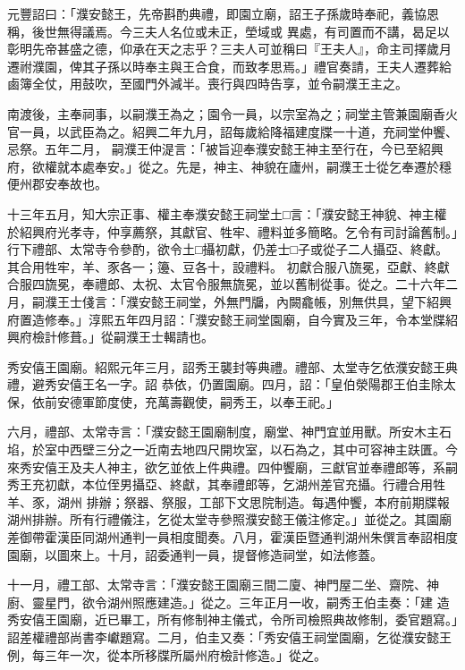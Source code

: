 \begin{pinyinscope}
 元豐詔曰：「濮安懿王，先帝斟酌典禮，即園立廟，詔王子孫歲時奉祀，義協恩稱，後世無得議焉。今三夫人名位或未正，塋域或
 異處，有司置而不講，曷足以彰明先帝甚盛之德，仰承在天之志乎？三夫人可並稱曰『王夫人』，命主司擇歲月遷祔濮園，俾其子孫以時奉主與王合食，而致孝思焉。」禮官奏請，王夫人遷葬給鹵簿全仗，用鼓吹，至國門外減半。喪行與四時告享，並令嗣濮王主之。



 南渡後，主奉祠事，以嗣濮王為之；園令一員，以宗室為之；祠堂主管兼園廟香火官一員，以武臣為之。紹興二年九月，詔每歲給降福建度牒一十道，充祠堂仲饗、忌祭。五年二月，
 嗣濮王仲湜言：「被旨迎奉濮安懿王神主至行在，今已至紹興府，欲權就本處奉安。」從之。先是，神主、神貌在廬州，嗣濮王士從乞奉遷於穩便州郡安奉故也。



 十三年五月，知大宗正事、權主奉濮安懿王祠堂土□言：「濮安懿王神貌、神主權於紹興府光孝寺，仲享薦祭，其獻官、牲牢、禮料並多簡略。乞令有司討論舊制。」行下禮部、太常寺令參酌，欲令土□攝初獻，仍差士□子或從子二人攝亞、終獻。其合用牲牢，羊、豕各一；籩、豆各十，設禮料。
 初獻合服八旒冕，亞獻、終獻合服四旒冕，奉禮郎、太祝、太官令服無旒冕，並以舊制從事。從之。二十六年二月，嗣濮王士俴言：「濮安懿王祠堂，外無門牖，內闕龕帳，別無供具，望下紹興府置造修奉。」淳熙五年四月詔：「濮安懿王祠堂園廟，自今實及三年，令本堂牒紹興府檢計修葺。」從嗣濮王士輵請也。



 秀安僖王園廟。紹熙元年三月，詔秀王襲封等典禮。禮部、太堂寺乞依濮安懿王典禮，避秀安僖王名一字。詔
 恭依，仍置園廟。四月，詔：「皇伯滎陽郡王伯圭除太保，依前安德軍節度使，充萬壽觀使，嗣秀王，以奉王祀。」



 六月，禮部、太常寺言：「濮安懿王園廟制度，廟堂、神門宜並用獸。所安木主石埳，於室中西壁三分之一近南去地四尺開坎室，以石為之，其中可容神主趺匱。今來秀安僖王及夫人神主，欲乞並依上件典禮。四仲饗廟，三獻官並奉禮郎等，系嗣秀王充初獻，本位侄男攝亞、終獻，其奉禮郎等，乞湖州差官充攝。行禮合用牲羊、豕，湖州
 排辦；祭器、祭服，工部下文思院制造。每遇仲饗，本府前期牒報湖州排辦。所有行禮儀注，乞從太堂寺參照濮安懿王儀注修定。」並從之。其園廟差御帶霍漢臣同湖州通判一員相度聞奏。八月，霍漢臣暨通判湖州朱僎言奉詔相度園廟，以圖來上。十月，詔委通判一員，提督修造祠堂，如法修蓋。



 十一月，禮工部、太常寺言：「濮安懿王園廟三間二廈、神門屋二坐、齋院、神廚、靈星門，欲令湖州照應建造。」從之。三年正月一收，嗣秀王伯圭奏：「建
 造秀安僖王園廟，近已畢工，所有修制神主儀式，令所司檢照典故修制，委官題寫。」詔差權禮部尚書李巘題寫。二月，伯圭又奏：「秀安僖王祠堂園廟，乞從濮安懿王例，每三年一次，從本所移牒所屬州府檢計修造。」從之。




\end{pinyinscope}
